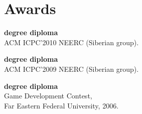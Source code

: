\documentclass[a4paper]{article}
\begin{document}
\section{Awards}
\begin{items}
  \begin{multicols}{2}
    \raggedcolumns
  \item \textbf{ degree diploma}\\ACM ICPC'2010 NEERC (Siberian group).
  \item \textbf{ degree diploma}\\ACM ICPC'2009 NEERC (Siberian group).
    \columnbreak
  \item \textbf{ degree diploma}\\Game Development Contest,\\Far Eastern Federal University, 2006.
  \end{multicols}
\end{items}
\end{document}
